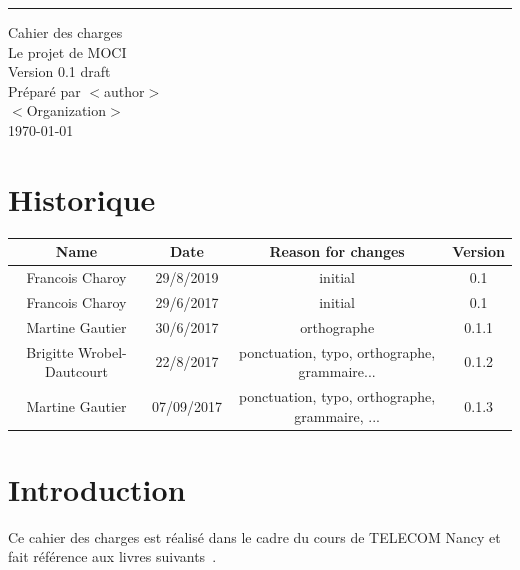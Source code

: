 \documentclass{scrreprt}
\date{}
\def\myversion{0.1 }
\begin{document}
\renewcommand*{\glsclearpage}{}
\begin{flushright}
    \rule{16cm}{5pt}\vskip1cm
    \begin{bfseries}
        \Huge{Cahier des charges}\\
        \vspace{1.9cm}
        Le projet de MOCI\\
        \vspace{1.9cm}
        \LARGE{Version \myversion draft}\\
        \vspace{1.9cm}
        Préparé par $<$author$>$\\
        \vspace{1.9cm}
        $<$Organization$>$\\
        \vspace{1.9cm}
        \today\\
    \end{bfseries}
\end{flushright}

\tableofcontents

\chapter*{Historique}

\begin{center}
    \begin{tabular}{|c|c|c|c|}
        \hline
	    Name & Date & Reason for changes & Version\\
        \hline
	    Francois Charoy & 29/8/2019 & initial & 0.1\\
        \hline
	    Francois Charoy & 29/6/2017 & initial & 0.1\\
        \hline
	    Martine Gautier & 30/6/2017 & orthographe & 0.1.1\\
        \hline
        Brigitte Wrobel-Dautcourt & 22/8/2017 & ponctuation, typo, orthographe, grammaire... & 0.1.2\\
        \hline
        Martine Gautier & 07/09/2017 & ponctuation, typo, orthographe, grammaire, ... & 0.1.3\\
        \hline
    \end{tabular}
\end{center}

\chapter{Introduction}
Ce cahier des charges est réalisé dans le cadre du cours de TELECOM Nancy  et fait référence aux livres suivants~\cite{Sommerville:2010:SE:1841764,Pohl:2010:REF:1869735,Rumbaugh:2004:UML:993859}.
\end{document}
